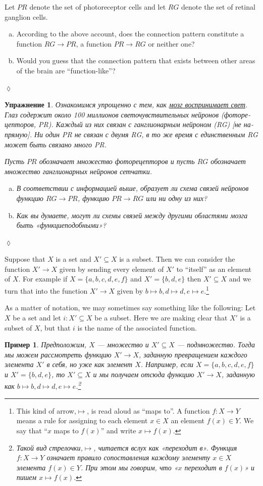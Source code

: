 \documentclass[a4paper]{book}
\def\to{\rightarrow}
\def\taking{\colon}
\def\ss{\subseteq}
\theoremstyle{myth}
\newtheorem{exampleENG}[envENG]{\begin{english}Example\end{english}}
\newtheorem{excENG}[envENG]{\begin{english}Exercise\end{english}}
\newenvironment{exerciseENG}{\begin{excENG}}{\hspace*{\fill}$\lozenge$\end{excENG}}
\newtheorem{exampleRUS}[envRUS]{Пример}
\newtheorem{excRUS}[envRUS]{Упражнение}
\newenvironment{exerciseRUS}{\begin{excRUS}}{\hspace*{\fill}$\lozenge$\end{excRUS}}
\def\sexc{\begin{enumerate}[a.)]\setlength{\itemsep}{.1cm}\setlength{\parskip}{.1cm}\item}
\def\next{\item}
\def\endsexc{\end{enumerate}}
\begin{document}
\begin{russian}
\begin{exerciseENG}
Let $PR$ denote the set of photoreceptor cells and let $RG$ denote the set of retinal ganglion cells. 
\sexc According to the above account, does the connection pattern constitute a function $RG\to PR$, a function $PR\to RG$ or neither one? 
\next Would you guess that the connection pattern that exists between other areas of the brain are “function-like”?
\endsexc
\end{exerciseENG}

\begin{exerciseRUS}
Ознакомимся упрощенно с тем, как \href{https://ru.wikipedia.org/wiki/%D0%A1%D0%B5%D1%82%D1%87%D0%B0%D1%82%D0%BA%D0%B0}{\text мозг воспринимает свет}. Глаз содержит около 100 миллионов светочувствительных нейронов (фоторецепторов, PR). Каждый из них связан с ганглионарным нейроном (RG) [не напрямую]. Ни один PR не связан с двумя RG, в то же время с единственным RG может быть связано много PR.

Пусть $PR$ обозначает множество фоторецепторов и пусть $RG$ обозначает множество ганглионарных нейронов сетчатки. 
\sexc В соответствии с информацией выше, образует ли схема связей нейронов функцию $RG\to PR$, функцию $PR\to RG$ или ни одну из них? 
\next Как вы думаете, могут ли схемы связей между другими областями мозга быть «функциеподобными»? 
\endsexc 
\end{exerciseRUS}

\begin{exampleENG}\label{ex:subset as function}
Suppose that $X$ is a set and $X'\ss X$ is a subset. Then we can consider the function $X'\to X$ given by sending every element of $X'$ to “itself” as an element of $X$. For example if $X=\{a,b,c,d,e,f\}$ and $X'=\{b,d,e\}$ then $X'\ss X$ and we turn that into the function $X'\to X$ given by $b\mapsto b, d\mapsto d, e\mapsto e$.\footnote{This kind of arrow,\;\;$\mapsto$\;\;, is read aloud as “maps to”. A function $f\taking X\to Y$ means a rule for assigning to each element $x\in X$ an element $f(x)\in Y$. We say that “$x$ maps to $f(x)$” and write $x\mapsto f(x)$.}

As a matter of notation, we may sometimes say something like the following: Let $X$ be a set and let $i\taking X'\ss X$ be a subset. Here we are making clear that $X'$ is a subset of $X$, but that $i$ is the name of the associated function.
\end{exampleENG}

\begin{exampleRUS}\label{ex:subset as function}
Предположим, $X$ — множество и $X'\ss X$ — подмножество. Тогда мы можем рассмотреть функцию $X'\to X$, заданную превращением каждого элемента $X'$ в себя, но уже как элемент $X$. Например, если $X=\{a,b,c,d,e,f\}$ и $X'=\{b,d,e\}$, то $X'\ss X$ и мы получаем отсюда функцию $X'\to X$, заданную как $b\mapsto b, d\mapsto d, e\mapsto e$.\footnote{Такой вид стрелочки,\;\;$\mapsto$\;\;, читается вслух как «переходит в». Функция $f\taking X\to Y$ означает правило сопоставления каждому элементу $x\in X$ элемента $f(x)\in Y$. При этом мы говорим, что «$x$ переходит в $f(x)$» и пишем $x\mapsto f(x)$.}


\end{exampleRUS}
\end{russian}
\end{document}
